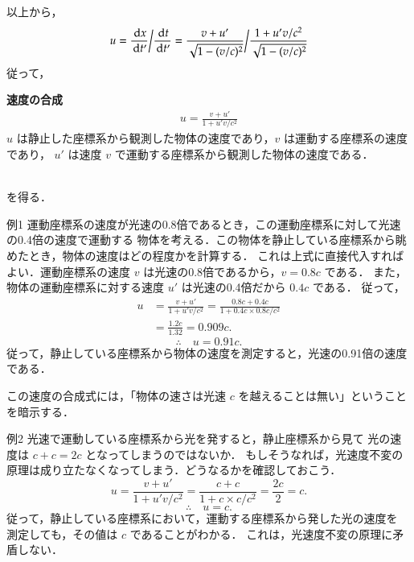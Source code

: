     以上から，
        \begin{equation*}
            u=\frac{\,\mathrm{d} x}{\,\mathrm{d} t'}\bigg/ \frac{\,\mathrm{d} t}{\,\mathrm{d} t'}
            =\frac{v+u'}{\sqrt{ 1-(v/c)^{2} }}\bigg/\frac{1+u'v/{c}^{2}}{\sqrt{ 1-(v/c)^{2} }}
        \end{equation*}
    従って，\\
    \begin{itembox}[l]{\textbf{速度の合成}}
        \begin{align}\label{eq:velocity_conversion}
            u=\frac{v+u'}{1+u'v/{c}^{2}}
        \end{align}
    $u$ は静止した座標系から観測した物体の速度であり，$v$ は運動する座標系の速度であり，
    $u'$ は速度 $v$ で運動する座標系から観測した物体の速度である．
    \end{itembox}\\
    を得る．


    \begin{memo}{例1}
        運動座標系の速度が光速の0.8倍であるとき，この運動座標系に対して光速の0.4倍の速度で運動する
        物体を考える．この物体を静止している座標系から眺めたとき，物体の速度はどの程度かを計算する．
        これは上式に直接代入すればよい．運動座標系の速度 $v$ は光速の0.8倍であるから，$v=0.8c$ である．
        また，物体の運動座標系に対する速度 $u'$ は光速の0.4倍だから $0.4c$ である．
        従って，
        \begin{align*}
         u&=\frac{v+u'}{1+u'v/{c}^{2}}=\frac{0.8c+0.4c}{1+0.4c\times 0.8c/{c}^{2}} \\
          &=\frac{1.2c}{1.32}=0.909c.
        \end{align*}
        \begin{equation*}
        \therefore \quad u=0.91c.
        \end{equation*}
        従って，静止している座標系から物体の速度を測定すると，光速の0.91倍の速度である．

        この速度の合成式には，「物体の速さは光速 $c$ を越えることは無い」ということを暗示する．
    \end{memo}

    \begin{memo}{例2}
        光速で運動している座標系から光を発すると，静止座標系から見て
        光の速度は $c+c=2c$ となってしまうのではないか．
        もしそうなれば，光速度不変の原理は成り立たなくなってしまう．どうなるかを確認しておこう．
        \begin{equation*}
        u=\frac{v+u'}{1+u'v/{c}^{2}}=\frac{c+c}{1+c\times c/{c}^{2}}
        =\frac{2c}{2}=c.
        \end{equation*}
        \begin{equation*}
        \therefore \quad u=c.
        \end{equation*}
        従って，静止している座標系において，運動する座標系から発した光の速度を
        測定しても，その値は $c$ であることがわかる．
        これは，光速度不変の原理に矛盾しない．
    \end{memo}


